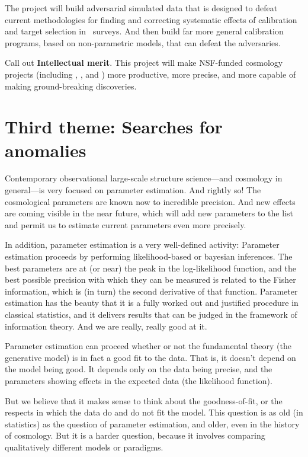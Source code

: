 \documentclass[12pt, fullpage, letterpaper]{article}
\begin{document}
The project will build adversarial simulated data that is
designed to defeat current methodologies for finding and correcting
systematic effects of calibration and target selection in \LSS\ 
surveys. And then build far more general calibration
programs, based on non-parametric models, that can defeat the
adversaries.

Call out \textbf{Intellectual merit}.
This project will make NSF-funded cosmology projects (including
\SDSSIV, \DESI, and \LSST) more productive, more precise, and more
capable of making ground-breaking discoveries.

\section{Third theme: Searches for anomalies}

Contemporary observational large-scale structure science---and
cosmology in general---is very focused on parameter estimation.
And rightly so!
The cosmological parameters are known now to incredible precision.
And new effects are coming visible in the near future, which will add
new parameters to the list and permit us to estimate current
parameters even more precisely.

In addition, parameter estimation is a very well-defined activity:
Parameter estimation proceeds by performing likelihood-based or
bayesian inferences.
The best parameters are at (or near) the peak in the log-likelihood
function, and the best possible precision with which they can be
measured is related to the Fisher information, which is (in turn) the
second derivative of that function.
Parameter estimation has the beauty that it is a fully worked out and
justified procedure in classical statistics, and it delivers results
that can be judged in the framework of information theory.
And we are really, really good at it.

Parameter estimation can proceed whether or not the fundamental theory
(the generative model) is in fact a good fit to the data.
That is, it doesn't depend on the model being good.
It depends only on the data being precise, and the parameters showing
effects in the expected data (the likelihood function).

But we believe that it makes sense to think about the goodness-of-fit,
or the respects in which the data do and do not fit the model.
This question is as old (in statistics) as the question of parameter
estimation, and older, even in the history of cosmology.
But it is a harder question, because it involves comparing
qualitatively different models or paradigms.
\end{document}

